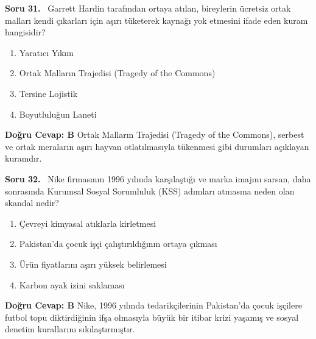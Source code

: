 \documentclass[11pt,a4paper,openany]{book}
\begin{document}
\needspace{5cm}
\vspace{8pt}
\noindent\textbf{\large\sffamily Soru 31.} \ Garrett Hardin tarafından ortaya atılan, bireylerin ücretsiz ortak malları kendi çıkarları için aşırı tüketerek kaynağı yok etmesini ifade eden kuram hangisidir?
\begin{enumerate}[label=\Alph*), leftmargin=25pt, topsep=4pt, itemsep=2pt]
    \item Yaratıcı Yıkım
    \item Ortak Malların Trajedisi (Tragedy of the Commons)
    \item Tersine Lojistik
    \item Boyutluluğun Laneti
\end{enumerate}
\vspace{4pt}
\begin{tcolorbox}[title=Cevap ve Açıklama, colback=gray!3!white, colframe=primarycolor!90!black, arc=2mm, fonttitle=\bfseries\sffamily, top=6pt, bottom=6pt]
    \textbf{Doğru Cevap: B}
    \vspace{2pt}
    Ortak Malların Trajedisi (Tragedy of the Commons), serbest ve ortak meraların aşırı hayvan otlatılmasıyla tükenmesi gibi durumları açıklayan kuramdır.
\end{tcolorbox}
\vspace{10pt}

\needspace{5cm}
\vspace{8pt}
\noindent\textbf{\large\sffamily Soru 32.} \ Nike firmasının 1996 yılında karşılaştığı ve marka imajını sarsan, daha sonrasında Kurumsal Sosyal Sorumluluk (KSS) adımları atmasına neden olan skandal nedir?
\begin{enumerate}[label=\Alph*), leftmargin=25pt, topsep=4pt, itemsep=2pt]
    \item Çevreyi kimyasal atıklarla kirletmesi
    \item Pakistan'da çocuk işçi çalıştırıldığının ortaya çıkması
    \item Ürün fiyatlarını aşırı yüksek belirlemesi
    \item Karbon ayak izini saklaması
\end{enumerate}
\vspace{4pt}
\begin{tcolorbox}[title=Cevap ve Açıklama, colback=gray!3!white, colframe=primarycolor!90!black, arc=2mm, fonttitle=\bfseries\sffamily, top=6pt, bottom=6pt]
    \textbf{Doğru Cevap: B}
    \vspace{2pt}
    Nike, 1996 yılında tedarikçilerinin Pakistan'da çocuk işçilere futbol topu diktirdiğinin ifşa olmasıyla büyük bir itibar krizi yaşamış ve sosyal denetim kurallarını sıkılaştırmıştır.
\end{tcolorbox}
\vspace{10pt}
\end{document}
